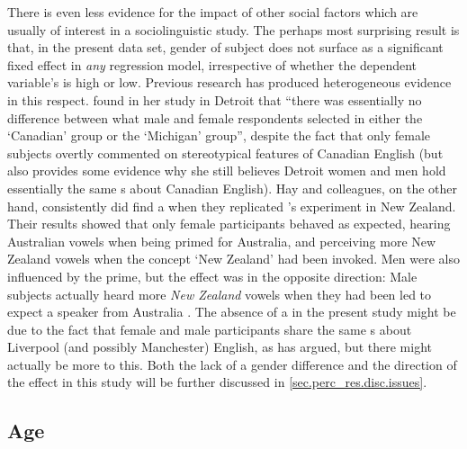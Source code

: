 There is even less evidence for the impact of other social factors which are usually of interest in a sociolinguistic study.
The perhaps most surprising result is that, in the present data set, gender of subject does not surface as a significant fixed effect in \emph{any} regression model, irrespective of whether the dependent variable's  is high or low.
Previous research has produced heterogeneous evidence in this respect.
\textcite[69 and 79--80]{niedzielski1999} found in her study in Detroit that ``there was essentially no difference between what male and female respondents selected in either the `Canadian' group or the `Michigan' group'', despite the fact that only female subjects overtly commented on stereotypical features of Canadian English (but \citeauthor{niedzielski1999} also provides some evidence why she still believes Detroit women and men hold essentially the same s about Canadian English).
Hay and colleagues, on the other hand, consistently did find a  when they replicated \citeauthor{niedzielski1999}'s experiment in New Zealand.
Their results showed that only female participants behaved as expected, hearing Australian vowels when being primed for Australia, and perceiving more New Zealand vowels when the concept `New Zealand' had been invoked.
Men were also influenced by the prime, but the  effect was in the opposite direction: Male subjects actually heard more \emph{New Zealand} vowels when they had been led to expect a speaker from Australia \parencite{hayetal2006a,haydrager2010}.
The absence of a  in the present study might be due to the fact that female and male participants share the same s about Liverpool (and possibly Manchester) English, as \citeauthor{niedzielski1999} has argued, but there might actually be more to this.
Both the lack of a gender difference and the direction of the  effect in this study will be further discussed in \ref{sec.perc_res.disc.issues}.

		\subsection{Age}

